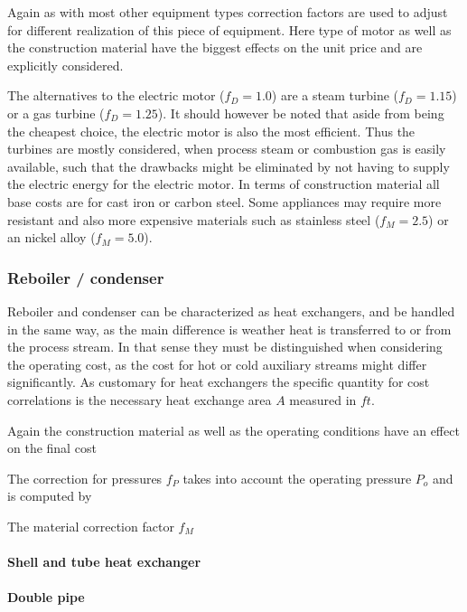 		Again as with most other equipment types correction factors are used to adjust for different realization
		of this piece of equipment. Here type of motor as well as the construction material have the biggest
		effects on the unit price and are explicitly considered.
		
		The alternatives to the electric motor ($f_D = 1.0$) are a steam turbine ($f_D = 1.15$) or a gas turbine
		($f_D = 1.25$). It should however be noted that aside from being the cheapest choice, the electric motor
		is also the most efficient. Thus the turbines are mostly considered, when process steam or combustion gas
		is easily available, such that the drawbacks might be eliminated by not having to supply the electric
		energy for the electric motor. In terms of construction material all base costs are for cast iron or
		carbon steel. Some appliances may require more resistant and also more expensive materials such as
		stainless steel ($f_M = 2.5$) or an nickel alloy ($f_M = 5.0$).
		
	\subsubsection{Reboiler / condenser}
		Reboiler and condenser can be characterized as heat exchangers, and be handled in the same way,
		as the main difference is weather heat is transferred to or from the process stream. In that sense
		they must be distinguished when considering the operating cost, as the cost for hot or cold
		auxiliary streams might differ significantly. As customary for heat exchangers the specific
		quantity for cost correlations is the necessary heat exchange area $A$ measured in $ft$.
		
		Again the construction material as well as the operating conditions have an effect on the
		final cost
		
		The correction for pressures $f_P$ takes into account the operating pressure $P_o$ and
		is computed by
		
		The material correction factor $f_M$
		
		\paragraph{Shell and tube heat exchanger}
		
		\paragraph{Double pipe}
